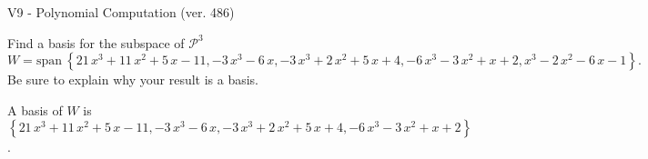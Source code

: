 \begin{exercise}
  \begin{exerciseTitle}V9 - Polynomial Computation (ver. 486)\end{exerciseTitle}
  \begin{exerciseStatement}
    Find a basis for the subspace of \(\mathcal{P}^3\) 
\[W=\mathrm{span}\ \left\{21 \, x^{3} + 11 \, x^{2} + 5 \, x - 11 , -3 \, x^{3} - 6 \, x , -3 \, x^{3} + 2 \, x^{2} + 5 \, x + 4 , -6 \, x^{3} - 3 \, x^{2} + x + 2 , x^{3} - 2 \, x^{2} - 6 \, x - 1\right\}.\]
 Be sure to explain why your result is a basis.


  \end{exerciseStatement}
  \begin{exerciseAnswer}
   A basis of \(W\) is  \(\left\{21 \, x^{3} + 11 \, x^{2} + 5 \, x - 11 , -3 \, x^{3} - 6 \, x , -3 \, x^{3} + 2 \, x^{2} + 5 \, x + 4 , -6 \, x^{3} - 3 \, x^{2} + x + 2\right\}\).
  


  \end{exerciseAnswer}
\end{exercise}